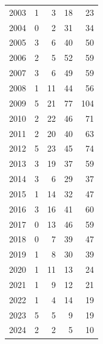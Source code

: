 \documentclass[
  english,
]{article}
\begin{document}
\begin{longtable}{rrrrr}
2003 & 1 & 3 & 18 & 23 \\ 
2004 & 0 & 2 & 31 & 34 \\ 
2005 & 3 & 6 & 40 & 50 \\ 
2006 & 2 & 5 & 52 & 59 \\ 
2007 & 3 & 6 & 49 & 59 \\ 
2008 & 1 & 11 & 44 & 56 \\ 
2009 & 5 & 21 & 77 & 104 \\ 
2010 & 2 & 22 & 46 & 71 \\ 
2011 & 2 & 20 & 40 & 63 \\ 
2012 & 5 & 23 & 45 & 74 \\ 
2013 & 3 & 19 & 37 & 59 \\ 
2014 & 3 & 6 & 29 & 37 \\ 
2015 & 1 & 14 & 32 & 47 \\ 
2016 & 3 & 16 & 41 & 60 \\ 
2017 & 0 & 13 & 46 & 59 \\ 
2018 & 0 & 7 & 39 & 47 \\ 
2019 & 1 & 8 & 30 & 39 \\ 
2020 & 1 & 11 & 13 & 24 \\ 
2021 & 1 & 9 & 12 & 21 \\ 
2022 & 1 & 4 & 14 & 19 \\ 
2023 & 5 & 5 & 9 & 19 \\ 
2024 & 2 & 2 & 5 & 10 \\ 
\bottomrule

\end{longtable}

\endgroup

\newpage{}

\begingroup
\fontsize{9.0pt}{11.0pt}\selectfont
\end{document}
